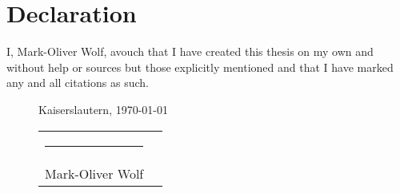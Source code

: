 \documentclass[]{scrartcl}
\begin{document}


			



	
	

\clearpage

\printbibliography[heading=bibintoc, title={References}]

\clearpage

\section*{Declaration}
	\vspace{2cm}
	
	\large
	I, Mark-Oliver Wolf, avouch that I have created this thesis on my own and without help or sources but those explicitly mentioned and that I have marked any and all citations as such.
	
	\vspace{3cm}
	\begin{figure}[b]
		Kaiserslautern, \today
		
		\vspace{2em}
		\begin{tabularx}{\linewidth}{@{}XX@{}}
			\hrule&\\
			Mark-Oliver Wolf & \\
		\end{tabularx}
	\end{figure}
\end{document}
